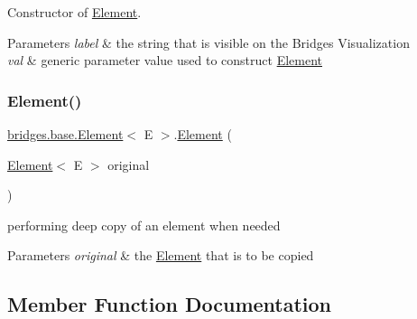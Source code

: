 Constructor of \hyperlink{classbridges_1_1base_1_1_element}{Element}. 


\begin{DoxyParams}{Parameters}
{\em label} & the string that is visible on the Bridges Visualization \\
\hline
{\em val} & generic parameter value used to construct \hyperlink{classbridges_1_1base_1_1_element}{Element} \\
\hline
\end{DoxyParams}
\mbox{\label{classbridges_1_1base_1_1_element_a91db9de70b65a1d7b5f27c1c0b909832}} 
\subsubsection{\texorpdfstring{Element()}{Element()}\hspace{0.1cm}{\footnotesize\ttfamily [4/4]}}
{\footnotesize\ttfamily \hyperlink{classbridges_1_1base_1_1_element}{bridges.\+base.\+Element}$<$ E $>$.\hyperlink{classbridges_1_1base_1_1_element}{Element} (\begin{DoxyParamCaption}\item[{\hyperlink{classbridges_1_1base_1_1_element}{Element}$<$ E $>$}]{original }\end{DoxyParamCaption})}



performing deep copy of an element when needed 


\begin{DoxyParams}{Parameters}
{\em original} & the \hyperlink{classbridges_1_1base_1_1_element}{Element} that is to be copied \\
\hline
\end{DoxyParams}


\subsection{Member Function Documentation}
\mbox{\label{classbridges_1_1base_1_1_element_a6cd4c4f15c6a4f87f59e443cffe87a20}} 
